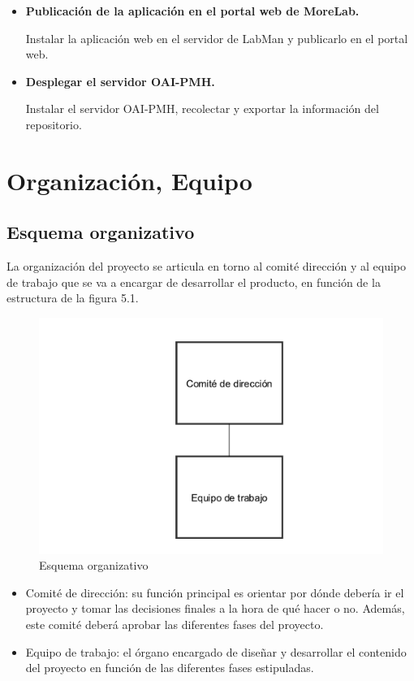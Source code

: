 \begin{itemize}
	\item \textbf{Publicación de la aplicación en el portal web de MoreLab.}
	
	Instalar la aplicación web en el servidor de LabMan y publicarlo en el portal web.
	\item \textbf{Desplegar el servidor OAI-PMH.}

	Instalar el servidor OAI-PMH, recolectar y exportar la información del repositorio.
\end{itemize}

\chapter{Organización, Equipo}

\section{Esquema organizativo}

La organización del proyecto se articula en torno al comité dirección y al equipo de trabajo que se va a encargar de desarrollar el producto, en función de la estructura de la figura 5.1.

\begin{figure}[!htp]
	\centering
	\includegraphics[scale=.75]{fig/organization}
	\caption{Esquema organizativo}
\end{figure}

\begin{itemize}
	\item Comité de dirección: su función principal es orientar por dónde debería ir el proyecto y tomar las decisiones finales a la hora de qué hacer o no.  Además, este comité deberá aprobar las diferentes fases del proyecto.
	\item Equipo de trabajo: el órgano encargado de diseñar y desarrollar el contenido del proyecto en función de las diferentes fases estipuladas.
\end{itemize}

